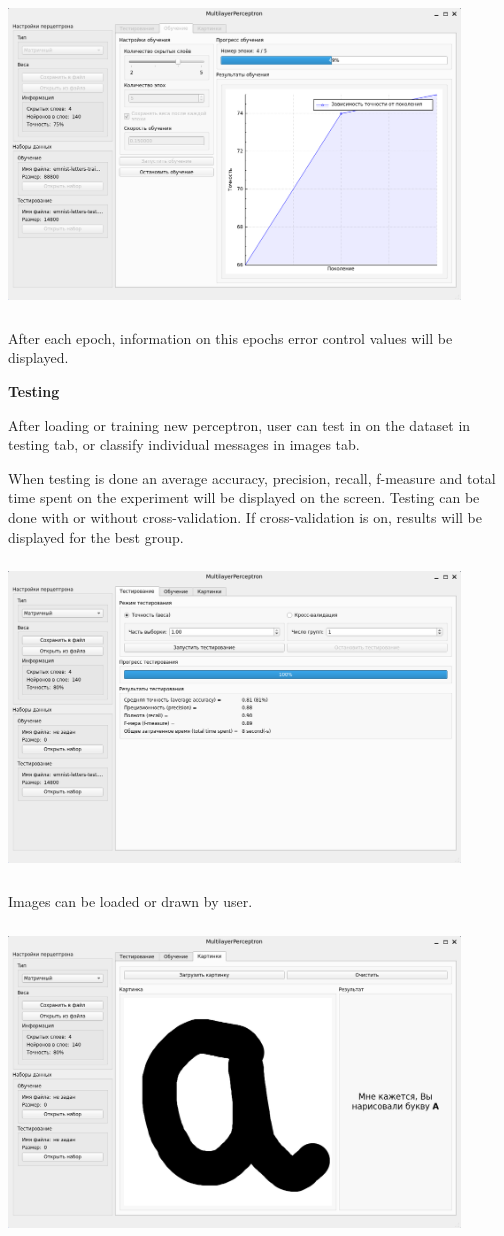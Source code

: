 \documentclass[12pt, letterpaper
]{article}
\begin{document}
\includegraphics[width=4.72361in,height=3.25208in]{images/training.png}

After each epoch, information on this epochs error control values will be displayed.

\textbf{Testing}

After loading or training new perceptron, user can test in on the dataset in testing tab, or classify individual messages in images tab.

When testing is done an average accuracy, precision, recall, f-measure and total time spent on the experiment will be displayed on the screen.
Testing can be done with or without cross-validation. If cross-validation is on, results will be displayed for the best group.

\includegraphics[width=4.72361in,height=3.25208in]{images/testing.png}

Images can be loaded or drawn by user.

\includegraphics[width=4.72361in,height=3.25208in]{images/images.png}
\end{document}
